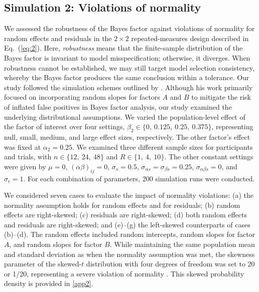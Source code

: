 \documentclass[preprint,12pt,authoryear]{elsarticle}
\begin{document}

\subsection{Simulation 2: Violations of normality}
\label{sec4.3}

We assessed the robustness of the Bayes factor against violations of normality for random effects and residuals in the $2\times2$ repeated-measures design described in Eq.~(\ref{eq:2}). Here, \textit{robustness} means that the finite-sample distribution of the Bayes factor is invariant to model misspecification; otherwise, it diverges. When robustness cannot be established, we may still target model selection consistency, whereby the Bayes factor produces the same conclusion within a tolerance. Our study followed the simulation schemes outlined by \citet[p.~649]{oberauer_importance_2022}. Although his work primarily focused on incorporating random slopes for factors $A$ and $B$ to mitigate the risk of inflated false positives in Bayes factor analysis, our study examined the underlying distributional assumptions. We varied the population-level effect of the factor of interest over four settings, $\beta_2\in\{0,\ \!0.125,\ \!0.25,\ \!0.375\}$, representing null, small, medium, and large effect sizes, respectively. The other factor's effect was fixed at $\alpha_2=0.25$. We examined three different sample sizes for participants and trials, with $n\in\{12,\ \!24,\ \!48\}$ and $R\in\{1,\ \!4,\ \!10\}$. The other constant settings were given by $\mu=0$, $(\alpha\beta)_{ij}=0$, $ \sigma_s=0.5$, $\sigma_{\alpha s}=\sigma_{\beta s}=0.25$, $\sigma_{\alpha\beta s}=0$, and $\sigma_\epsilon=1$. For each combination of parameters, 200 simulation runs were conducted.

We considered seven cases to evaluate the impact of normality violations: (a) the normality assumption holds for random effects and for residuals; (b) random effects are right-skewed; (c) residuals are right-skewed; (d) both random effects and residuals are right-skewed; and (e)–(g) the left-skewed counterparts of cases (b)–(d). The random effects included random intercepts, random slopes for factor $A$, and random slopes for factor $B$. While maintaining the same population mean and standard deviation as when the normality assumption was met, the skewness parameter of the skewed-$t$ distribution with four degrees of freedom was set to 20 or 1/20, representing a severe violation of normality \citep{wuertz_fgarch_2024}. This skewed probability density is provided in \ref{app2}.
\end{document}
